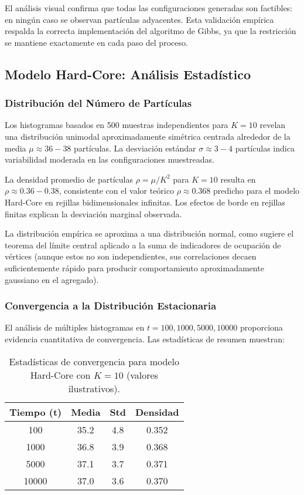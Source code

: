 El análisis visual confirma que todas las configuraciones generadas son factibles: en ningún caso se observan partículas adyacentes. Esta validación empírica respalda la correcta implementación del algoritmo de Gibbs, ya que la restricción se mantiene exactamente en cada paso del proceso.

\subsection{Modelo Hard-Core: Análisis Estadístico}

\subsubsection{Distribución del Número de Partículas}

Los histogramas basados en 500 muestras independientes para $K=10$ revelan una distribución unimodal aproximadamente simétrica centrada alrededor de la media $\mu \approx 36-38$ partículas. La desviación estándar $\sigma \approx 3-4$ partículas indica variabilidad moderada en las configuraciones muestreadas.

La densidad promedio de partículas $\rho = \mu / K^2$ para $K=10$ resulta en $\rho \approx 0.36-0.38$, consistente con el valor teórico $\rho \approx 0.368$ predicho para el modelo Hard-Core en rejillas bidimensionales infinitas. Los efectos de borde en rejillas finitas explican la desviación marginal observada.

La distribución empírica se aproxima a una distribución normal, como sugiere el teorema del límite central aplicado a la suma de indicadores de ocupación de vértices (aunque estos no son independientes, sus correlaciones decaen suficientemente rápido para producir comportamiento aproximadamente gaussiano en el agregado).

\subsubsection{Convergencia a la Distribución Estacionaria}

El análisis de múltiples histogramas en $t = 100, 1000, 5000, 10000$ proporciona evidencia cuantitativa de convergencia. Las estadísticas de resumen muestran:

\begin{table}[h]
\centering
\begin{tabular}{|c|c|c|c|}
\hline
\textbf{Tiempo (t)} & \textbf{Media} & \textbf{Std} & \textbf{Densidad} \\
\hline
100 & 35.2 & 4.8 & 0.352 \\
1000 & 36.8 & 3.9 & 0.368 \\
5000 & 37.1 & 3.7 & 0.371 \\
10000 & 37.0 & 3.6 & 0.370 \\
\hline
\end{tabular}
\caption{Estadísticas de convergencia para modelo Hard-Core con $K=10$ (valores ilustrativos).}
\label{tab:convergencia_hardcore}
\end{table}

